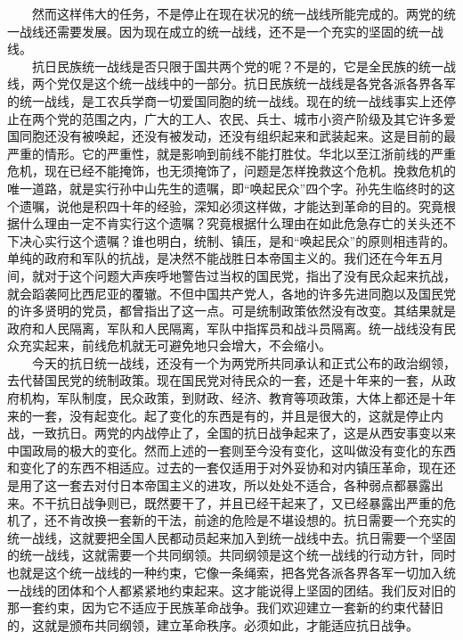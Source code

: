 \documentclass[cn,11pt,chinese]{elegantbook}
\begin{document}
　　然而这样伟大的任务，不是停止在现在状况的统一战线所能完成的。两党的统一战线还需要发展。因为现在成立的统一战线，还不是一个充实的坚固的统一战线。\\
　　抗日民族统一战线是否只限于国共两个党的呢？不是的，它是全民族的统一战线，两个党仅是这个统一战线中的一部分。抗日民族统一战线是各党各派各界各军的统一战线，是工农兵学商一切爱国同胞的统一战线。现在的统一战线事实上还停止在两个党的范围之内，广大的工人、农民、兵士、城市小资产阶级及其它许多爱国同胞还没有被唤起，还没有被发动，还没有组织起来和武装起来。这是目前的最严重的情形。它的严重性，就是影响到前线不能打胜仗。华北以至江浙前线的严重危机，现在已经不能掩饰，也无须掩饰了，问题是怎样挽救这个危机。挽救危机的唯一道路，就是实行孙中山先生的遗嘱，即“唤起民众”四个字。孙先生临终时的这个遗嘱，说他是积四十年的经验，深知必须这样做，才能达到革命的目的。究竟根据什么理由一定不肯实行这个遗嘱？究竟根据什么理由在如此危急存亡的关头还不下决心实行这个遗嘱？谁也明白，统制、镇压，是和“唤起民众”的原则相违背的。单纯的政府和军队的抗战，是决然不能战胜日本帝国主义的。我们还在今年五月间，就对于这个问题大声疾呼地警告过当权的国民党，指出了没有民众起来抗战，就会蹈袭阿比西尼亚的覆辙。不但中国共产党人，各地的许多先进同胞以及国民党的许多贤明的党员，都曾指出了这一点。可是统制政策依然没有改变。其结果就是政府和人民隔离，军队和人民隔离，军队中指挥员和战斗员隔离。统一战线没有民众充实起来，前线危机就无可避免地只会增大，不会缩小。\\
　　今天的抗日统一战线，还没有一个为两党所共同承认和正式公布的政治纲领，去代替国民党的统制政策。现在国民党对待民众的一套，还是十年来的一套，从政府机构，军队制度，民众政策，到财政、经济、教育等项政策，大体上都还是十年来的一套，没有起变化。起了变化的东西是有的，并且是很大的，这就是停止内战，一致抗日。两党的内战停止了，全国的抗日战争起来了，这是从西安事变以来中国政局的极大的变化。然而上述的一套则至今没有变化，这叫做没有变化的东西和变化了的东西不相适应。过去的一套仅适用于对外妥协和对内镇压革命，现在还是用了这一套去对付日本帝国主义的进攻，所以处处不适合，各种弱点都暴露出来。不干抗日战争则已，既然要干了，并且已经干起来了，又已经暴露出严重的危机了，还不肯改换一套新的干法，前途的危险是不堪设想的。抗日需要一个充实的统一战线，这就要把全国人民都动员起来加入到统一战线中去。抗日需要一个坚固的统一战线，这就需要一个共同纲领。共同纲领是这个统一战线的行动方针，同时也就是这个统一战线的一种约束，它像一条绳索，把各党各派各界各军一切加入统一战线的团体和个人都紧紧地约束起来。这才能说得上坚固的团结。我们反对旧的那一套约束，因为它不适应于民族革命战争。我们欢迎建立一套新的约束代替旧的，这就是颁布共同纲领，建立革命秩序。必须如此，才能适应抗日战争。\\
\end{document}
